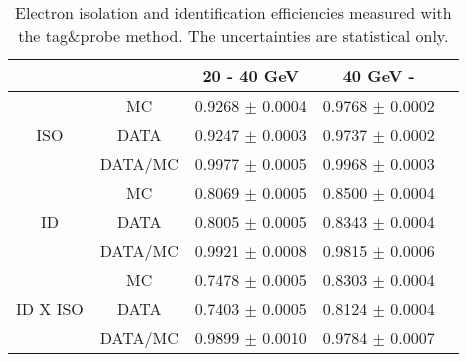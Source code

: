 \begin{table}[h]
\begin{center}
\begin{tabular}{c|c|ccc}
\hline\hline
& & 20 - 40 GeV & 40 GeV -  \\
\hline
				& MC			& 	0.9268 $\pm$ 0.0004 & 	0.9768 $\pm$ 0.0002 \\
ISO				& DATA			& 	0.9247 $\pm$ 0.0003 & 	0.9737 $\pm$ 0.0002 \\
				& DATA/MC		& 	0.9977 $\pm$ 0.0005 & 	0.9968 $\pm$ 0.0003 \\
\hline
				& MC			& 	0.8069 $\pm$ 0.0005 & 	0.8500 $\pm$ 0.0004 \\
ID				& DATA			& 	0.8005 $\pm$ 0.0005 & 	0.8343 $\pm$ 0.0004 \\
				& DATA/MC		& 	0.9921 $\pm$ 0.0008 & 	0.9815 $\pm$ 0.0006 \\
\hline
				& MC			& 	0.7478 $\pm$ 0.0005 & 	0.8303 $\pm$ 0.0004 \\
ID X ISO		& DATA			& 	0.7403 $\pm$ 0.0005 & 	0.8124 $\pm$ 0.0004 \\
				& DATA/MC		& 	0.9899 $\pm$ 0.0010 & 	0.9784 $\pm$ 0.0007 \\
\hline \hline
\hline
\end{tabular}
\caption{\label{tab:eleEffs}Electron isolation and identification efficiencies measured with the tag\&probe method.
The uncertainties are statistical only.}
\end{center}
\end{table}

